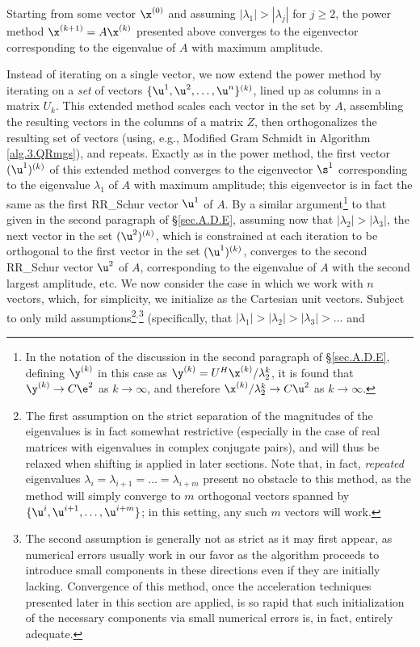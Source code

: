 
\noindent Starting from some vector $\x^{(0)}$ and assuming $|\lambda_1|>|\lambda_j|$ for $j\ge 2$,
the power method $\x^{(k+1)}=A\x^{(k)}$ presented above converges to the eigenvector corresponding
to the eigenvalue of $A$ with maximum amplitude. 

Instead of iterating on a single vector, we now extend the power method by iterating on a {\it set} of vectors $\{\u^{1},\u^{2},\ldots,\u^{n}\}^{(k)}$,
lined up as columns in a matrix ${U_k}$.  This extended method scales each vector in the set by $A$, assembling the resulting vectors in the columns of
a matrix $Z$, then orthogonalizes the resulting set of vectors (using, e.g., Modified Gram Schmidt in Algorithm \ref{alg.3.QRmgs}), and repeats.  
Exactly as in the power method, the first vector $(\u^{1})^{(k)}$ of this extended method converges to the eigenvector $\s^1$
corresponding to the eigenvalue $\lambda_1$ of $A$ with
maximum amplitude; this eigenvector is in fact the same as the first RR_Schur vector $\u^1$ of $A$.  By a similar argument\footnote{In the notation
of the discussion in the second paragraph of \S \ref{sec.A.D.E}, defining $\y^{(k)}$ in this case as $\y^{(k)}=U^H\x^{(k)}/\lambda^k_2$,
it is found that $\y^{(k)}\rightarrow C\e^2$ as $k\rightarrow\infty$, and therefore $\x^{(k)}/\lambda_2^k\rightarrow C\u^2$  as
$k\rightarrow\infty$.} to that given in the second paragraph of \S \ref{sec.A.D.E}, assuming now that $|\lambda_2|>|\lambda_3|$,
the next vector in the set $(\u^{2})^{(k)}$, which is constrained at each iteration to be orthogonal to the first vector in the set $(\u^{1})^{(k)}$,
converges to the second RR_Schur vector $\u^2$ of $A$, corresponding to the eigenvalue of $A$ with the second largest amplitude, etc.
We now consider the case in which we work with $n$ vectors, which, for simplicity, we initialize as the Cartesian unit vectors.  
Subject to only mild assumptions\footnote{The first assumption on the strict separation of the magnitudes of the eigenvalues
is in fact somewhat restrictive (especially in the case of real matrices with eigenvalues in complex conjugate pairs),
and will thus be relaxed when shifting is applied in later sections.  Note that, in fact, {\it repeated} eigenvalues
$\lambda_i=\lambda_{i+1}=\ldots=\lambda_{i+m}$
present no obstacle to this method, as the method will simply converge to $m$ orthogonal vectors spanned by $\{\u^i,\u^{i+1},\ldots,\u^{i+m}\}$;
in this setting, any such $m$ vectors will work.}$^{,}$\footnote{The \label{footnoteC} second assumption is generally not as strict as it may first appear, as numerical errors
usually work in our favor as the algorithm proceeds to introduce
small components in these directions even if they are initially lacking.  Convergence of this method, once the acceleration techniques
presented later in this section are applied, is so rapid that such initialization of the necessary components
via small numerical errors is, in fact, entirely adequate.} (specifically, that $|\lambda_1|>|\lambda_2|>|\lambda_3|>\ldots$ and
